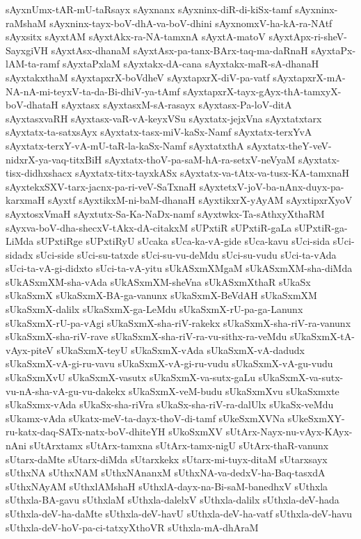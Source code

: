 {sAyxnUmx-tAR-mU-taRsayx
sAyxnanx
sAyxninx-diR-di-kiSx-tamf
sAyxninx-raMshaM
sAyxninx-tayx-boV-dhA-va-boV-dhini
sAyxnomxV-ha-kA-ra-NAtf
sAyxsitx
sAyxtAM
sAyxtAkx-ra-NA-tamxnA
sAyxtA-matoV
sAyxtApx-ri-sheV-SayxgiVH
sAyxtAsx-dhanaM
sAyxtAsx-pa-tanx-BArx-taq-ma-daRnaH
sAyxtaPx-lAM-ta-ramf
sAyxtaPxlaM
sAyxtakx-dA-cana
sAyxtakx-maR-sA-dhanaH
sAyxtakxthaM
sAyxtapxrX-boVdheV
sAyxtapxrX-diV-pa-vatf
sAyxtapxrX-mA-NA-nA-mi-teyxV-ta-da-Bi-dhiV-ya-tAmf
sAyxtapxrX-tayx-gAyx-thA-tamxyX-boV-dhataH
sAyxtasx
sAyxtasxM-sA-rasayx
sAyxtasx-Pa-loV-ditA
sAyxtasxvaRH
sAyxtasx-vaR-vA-keyxVSu
sAyxtatx-jejxVna
sAyxtatxtarx
sAyxtatx-ta-satxsAyx
sAyxtatx-tasx-miV-kaSx-Namf
sAyxtatx-terxYvA
sAyxtatx-terxY-vA-mU-taR-la-kaSx-Namf
sAyxtatxthA
sAyxtatx-theY-veV-nidxrX-ya-vaq-titxBiH
sAyxtatx-thoV-pa-saM-hA-ra-setxV-neVyaM
sAyxtatx-tisx-didhxshacx
sAyxtatx-titx-tayxkASx
sAyxtatx-va-tAtx-va-tusx-KA-tamxnaH
sAyxtekxSXV-tarx-jacnx-pa-ri-veV-SaTxnaH
sAyxtetxV-joV-ba-nAnx-duyx-pa-karxmaH
sAyxtf
sAyxtikxM-ni-baM-dhanaH
sAyxtikxrX-yAyAM
sAyxtipxrXyoV
sAyxtosxVmaH
sAyxtutx-Sa-Ka-NaDx-namf
sAyxtwkx-Ta-sAthxyXthaRM
sAyxva-boV-dha-shecxV-tAkx-dA-citakxM
sUPxtiR
sUPxtiR-gaLa
sUPxtiR-ga-LiMda
sUPxtiRge
sUPxtiRyU
sUcaka
sUca-ka-vA-gide
sUca-kavu
sUci-sida
sUci-sidadx
sUci-side
sUci-su-tatxde
sUci-su-vu-deMdu
sUci-su-vudu
sUci-ta-vAda
sUci-ta-vA-gi-didxto
sUci-ta-vA-yitu
sUkASxmXMgaM
sUkASxmXM-sha-diMda
sUkASxmXM-sha-vAda
sUkASxmXM-sheVna
sUkASxmXthaR
sUkaSx
sUkaSxmX
sUkaSxmX-BA-ga-vanunx
sUkaSxmX-BeVdAH
sUkaSxmXM
sUkaSxmX-dalilx
sUkaSxmX-ga-LeMdu
sUkaSxmX-rU-pa-ga-Lanunx
sUkaSxmX-rU-pa-vAgi
sUkaSxmX-sha-riV-rakekx
sUkaSxmX-sha-riV-ra-vanunx
sUkaSxmX-sha-riV-rave
sUkaSxmX-sha-riV-ra-vu-sithx-ra-veMdu
sUkaSxmX-tA-vAyx-piteV
sUkaSxmX-teyU
sUkaSxmX-vAda
sUkaSxmX-vA-dadudx
sUkaSxmX-vA-gi-ru-vavu
sUkaSxmX-vA-gi-ru-vudu
sUkaSxmX-vA-gu-vudu
sUkaSxmXvU
sUkaSxmX-vasutx
sUkaSxmX-va-sutx-gaLu
sUkaSxmX-va-sutx-vu-nA-sha-vA-gu-vu-dakekx
sUkaSxmX-veM-budu
sUkaSxmXvu
sUkaSxmxte
sUkaSxmx-vAda
sUkaSx-sha-riVra
sUkaSx-sha-riV-ra-dalUlx
sUkaSx-veMdu
sUkamx-vAda
sUkatx-meV-ta-dayx-thoV-di-tamf
sUkeSxmXVNa
sUkeSxmXY-ru-katx-daq-SATx-natx-boV-dhiteYH
sUkoSxmXV
sUtArx-Nayx-nu-vAyx-KAyx-nAni
sUtArxtamx
sUtArx-tamxna
sUtArx-tamx-nigU
sUtArx-thaR-vanunx
sUtarx-daMte
sUtarx-diMda
sUtarxkekx
sUtarx-mi-tuyx-ditaM
sUtarxsayx
sUthxNA
sUthxNAM
sUthxNAnanxM
sUthxNA-va-dedxV-ha-Baq-tasxdA
sUthxNAyAM
sUthxlAMshaH
sUthxlA-dayx-na-Bi-saM-banedhxV
sUthxla
sUthxla-BA-gavu
sUthxlaM
sUthxla-dalelxV
sUthxla-dalilx
sUthxla-deV-hada
sUthxla-deV-ha-daMte
sUthxla-deV-havU
sUthxla-deV-ha-vatf
sUthxla-deV-havu
sUthxla-deV-hoV-pa-ci-tatxyXthoVR
sUthxla-mA-dhAraM
}
